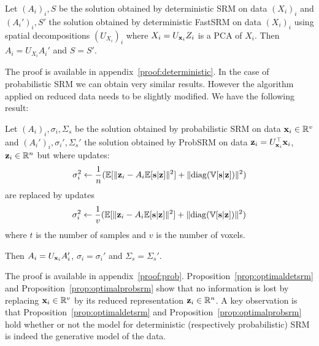 \documentclass{article}
\begin{document}
\begin{proposition}
  Let $(A_i)_i, S$ be the solution obtained by deterministic SRM on data
  $(X_i)_i$ and $(A_i')_i, S'$ the solution obtained by deterministic FastSRM on
  data $(X_i)_i$ using spatial decompositions $(U_{X_i})_i$ where $X_i = U_{\mathbf{x}_i} Z_i$ is a PCA
  of $X_i$.
  Then $A_i = U_{X_i}A_i'$ and $S = S'$.
  
\label{prop:optimaldetsrm}
\end{proposition}
The proof is available in appendix~\ref{proof:deterministic}.
In the case of probabilistic SRM we can obtain very similar results.
%
However the
algorithm applied on reduced data needs to be slightly modified.
%
We have the following result:
\begin{proposition}
  Let $(A_i)_i, \sigma_i, \Sigma_s$ be the solution obtained by probabilistic SRM on data
  $\mathbf{x}_i \in \mathbb{R}^v$ and $(A_i')_i, \sigma_i', \Sigma_s'$ the solution obtained by ProbSRM on
  data $\mathbf{z}_i = U_{\mathbf{x}_i}^{\top} \mathbf{x}_i$, $\mathbf{z}_i \in \mathbb{R}^n$ but where updates:
  \begin{align}
    \sigma_i^2 \leftarrow \frac1{n} (\mathbb{E}[\| \mathbf{z}_i - A_i \mathbb{E}[\mathbf{s}|\mathbf{z}]\|^2] + \| {\rm diag}(\mathbb{V}[\mathbf{s} | \mathbf{z}]) \|^2)
  \end{align}
  are replaced by updates
  \begin{align}
    \sigma_i^2 \leftarrow \frac1{v} (\mathbb{E}[\| \mathbf{z}_i - A_i \mathbb{E}[\mathbf{s}|\mathbf{z}]\|^2] + \| {\rm diag}(\mathbb{V}[\mathbf{s} | \mathbf{z}]) \|^2)
  \end{align}
  where $t$ is the number of samples and $v$ is the number of voxels.

  Then $A_i = U_{\mathbf{x}_i}A_i'$, $\sigma_i =
  \sigma_i'$ and $\Sigma_s = \Sigma_s'$.
  
  \label{prop:optimalprobsrm}
\end{proposition}
  The proof is available in appendix~\ref{proof:prob}.
Proposition~\ref{prop:optimaldetsrm} and Proposition~\ref{prop:optimalprobsrm} show that
no information is lost by replacing $\mathbf{x}_i \in \mathbb{R}^v$ by its reduced
representation $\mathbf{z}_i \in \mathbb{R}^n$.
%
A key observation is that Proposition~\ref{prop:optimaldetsrm} and
Proposition~\ref{prop:optimalprobsrm} hold whether or
not the model for deterministic (respectively probabilistic) SRM is indeed the
generative model of the data.
%
\end{document}
